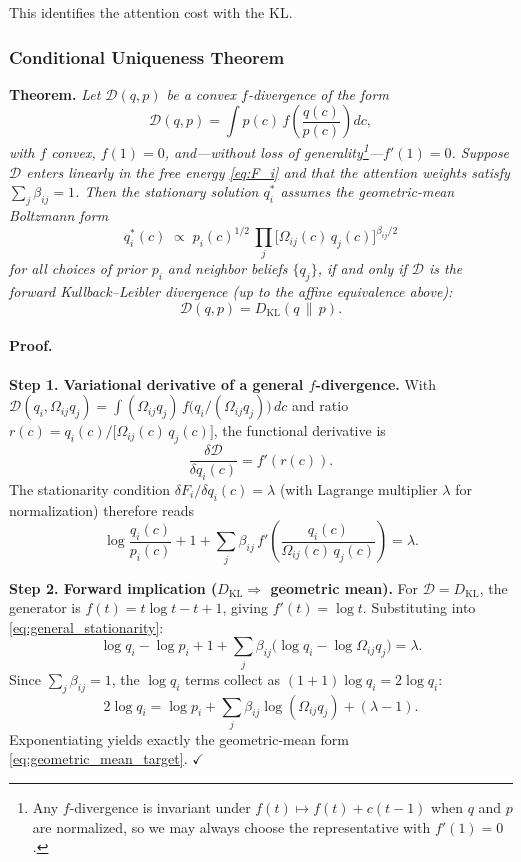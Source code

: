 \documentclass[twoside,11pt]{article}
\begin{document}
This identifies the attention cost with the KL.

\subsubsection{Conditional Uniqueness Theorem}
\label{thm:uniqueness}

\textbf{Theorem.} \textit{Let\/ $\mathcal{D}(q,p)$ be a convex $f$-divergence of the form
\[
\mathcal{D}(q,p)
= \int p(c)\,f\!\!\left(\frac{q(c)}{p(c)}\right)dc,
\]
with $f$ convex, $f(1)=0$, and---without loss of generality\footnote{Any $f$-divergence is invariant under $f(t)\mapsto f(t)+c(t-1)$ when $q$ and $p$ are normalized, so we may always choose the representative with $f'(1)=0$.}---$f'(1)=0$.  Suppose $\mathcal{D}$ enters linearly in the free energy \eqref{eq:F_i} and that the attention weights satisfy $\sum_j\beta_{ij}=1$.  Then the stationary solution $q_i^*$ assumes the geometric-mean Boltzmann form}
\begin{equation}
q_i^*(c) \;\propto\; p_i(c)^{1/2}\,\prod_{j}\bigl[\Omega_{ij}(c)\,q_j(c)\bigr]^{\beta_{ij}/2}
\label{eq:geometric_mean_target}
\end{equation}
\textit{for all choices of prior $p_i$ and neighbor beliefs $\{q_j\}$, if and only if $\mathcal{D}$ is the forward Kullback--Leibler divergence (up to the affine equivalence above):}
\[
\mathcal{D}(q,p) = D_{\mathrm{KL}}(q\,\|\,p).
\]

\paragraph{Proof.}

\textbf{Step 1.  Variational derivative of a general $f$-divergence.}
With $\mathcal{D}(q_i,\Omega_{ij}q_j)=\int (\Omega_{ij}q_j)\,f\!\bigl(q_i/(\Omega_{ij}q_j)\bigr)\,dc$ and ratio $r(c)=q_i(c)/\bigl[\Omega_{ij}(c)\,q_j(c)\bigr]$, the functional derivative is
\begin{equation}
\frac{\delta\mathcal{D}}{\delta q_i(c)} = f'(r(c)).
\end{equation}
The stationarity condition $\delta F_i/\delta q_i(c)=\lambda$ (with Lagrange multiplier $\lambda$ for normalization) therefore reads
\begin{equation}
\log\frac{q_i(c)}{p_i(c)} + 1
+ \sum_j \beta_{ij}\,f'\!\!\left(\frac{q_i(c)}{\Omega_{ij}(c)\,q_j(c)}\right) = \lambda.
\label{eq:general_stationarity}
\end{equation}

\textbf{Step 2.  Forward implication ($D_{\mathrm{KL}}\Rightarrow$ geometric mean).}
For $\mathcal{D}=D_{\mathrm{KL}}$, the generator is $f(t)=t\log t - t + 1$, giving $f'(t)=\log t$.  Substituting into \eqref{eq:general_stationarity}:
\[
\log q_i - \log p_i + 1 + \sum_j \beta_{ij}\bigl(\log q_i - \log\Omega_{ij}q_j\bigr) = \lambda.
\]
Since $\sum_j\beta_{ij}=1$, the $\log q_i$ terms collect as $(1+1)\log q_i = 2\log q_i$:
\[
2\log q_i = \log p_i + \sum_j\beta_{ij}\log(\Omega_{ij}q_j) + (\lambda - 1).
\]
Exponentiating yields exactly the geometric-mean form \eqref{eq:geometric_mean_target}. \hfill $\checkmark$
\end{document}

